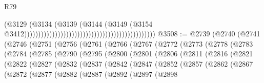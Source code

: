 \begin{lexlean}{R79}
\begin{coremodule}
                                                                                      (@3129
                                                                                        (@3134
                                                                                          (@3139
                                                                                            (@3144
                                                                                              (@3149
                                                                                                (@3154
                                                                                                  @3412)))))))))))))))))))))))))))))))))))))))))))))))
@3508 := @2739
    (@2740
      (@2741
        (@2746
          (@2751
            (@2756
              (@2761
                (@2766
                  (@2767
                    (@2772
                      (@2773
                        (@2778
                          (@2783
                            (@2784
                              (@2785
                                (@2790
                                  (@2795
                                    (@2800
                                      (@2801
                                        (@2806
                                          (@2811
                                            (@2816
                                              (@2821
                                                (@2822
                                                  (@2827
                                                    (@2832
                                                      (@2837
                                                        (@2842
                                                          (@2847
                                                            (@2852
                                                              (@2857
                                                                (@2862
                                                                  (@2867
                                                                    (@2872
                                                                      (@2877
                                                                        (@2882
                                                                          (@2887
                                                                            (@2892
                                                                              (@2897
                                                                                (@2898

\end{coremodule}
\end{lexlean}
